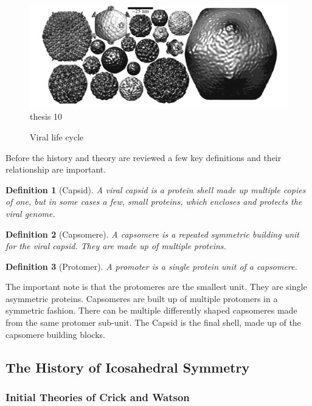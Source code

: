 \documentclass[12pt,letter]{article}
\newtheorem*{definition*}{Definition}
\begin{document}
\begin{figure}[h]
	\caption{Viral life cycle}
	\centering
	\includegraphics[width = .95\textwidth]{viruses.pdf}
	\label{fig:virus_types}
	thesis 10
\end{figure}

Before the history and theory are reviewed a few key definitions and their relationship are important.

\begin{definition*}[Capsid]
A viral capsid is a protein shell made up multiple copies of one, but in some cases a few, small proteins, which encloses and protects the viral genome.
\end{definition*}
\begin{definition*}[Capsomere]
A capsomere is a repeated symmetric building unit for the viral capsid. They are made up of multiple proteins.
\end{definition*}
\begin{definition*}[Protomer]
A promoter is a single protein unit of a capsomere.
\end{definition*}

The important note is that the protomeres are the smallest unit. They are single asymmetric proteins. Capsomeres are built up of multiple protomers in a symmetric fashion. There can be multiple differently shaped capsomeres made from the same protomer sub-unit. The Capsid is the final shell, made up of the capsomere building blocks.

\subsection{The History of Icosahedral Symmetry} %

\subsubsection{Initial Theories of Crick and Watson}
\end{document}
